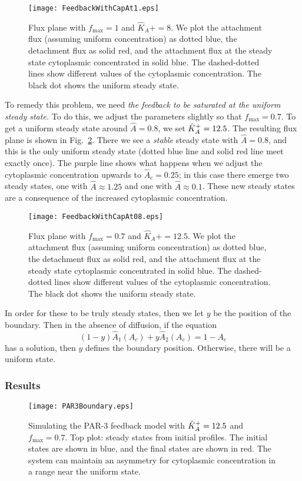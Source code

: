 \documentclass[11pt]{article}
\newcommand{\6}[1]{#1_{\text{6}}}
\newcommand{\3}[1]{#1_{\text{3}}}
\begin{document}
\begin{figure}
\centering
\texttt{[image: FeedbackWithCapAt1.eps]}
\caption{\label{fig:P3FB1}Flux plane with $f_\text{max}=1$ and $\hat K_A+=8$. We plot the attachment flux (assuming uniform concentration) as dotted blue, the detachment flux as solid red, and the attachment flux at the steady state cytoplasmic concentrated in solid blue. The dashed-dotted lines show different values of the cytoplasmic concentration. The black dot shows the uniform steady state.}
\end{figure}

To remedy this problem, we need \emph{the feedback to be saturated at the uniform steady state.} To do this, we adjust the parameters slightly so that $f_\text{max}=0.7$. To get a uniform steady state around $\hat A = 0.8$, we set $\hat{K}^\text{+}_A=12.5$. The resulting flux plane is shown in Fig.\ \ref{fig:P3FB08}. There we see a \emph{stable} steady state with $\hat A = 0.8$, and this is the only uniform steady state (dotted blue line and solid red line meet exactly once). The purple line shows what happens when we adjust the cytoplasmic concentration upwards to $\hat{A}_c=0.25$; in this case there emerge two steady states, one with $\hat{A}\approx 1.25$ and one with $\hat A \approx 0.1$. These new steady states are a consequence of the increased cytoplasmic concentration.

\begin{figure}
\centering
\texttt{[image: FeedbackWithCapAt08.eps]}
\caption{\label{fig:P3FB08}Flux plane with $f_\text{max}=0.7$ and $\hat K_A+=12.5$. We plot the attachment flux (assuming uniform concentration) as dotted blue, the detachment flux as solid red, and the attachment flux at the steady state cytoplasmic concentrated in solid blue. The dashed-dotted lines show different values of the cytoplasmic concentration. The black dot shows the uniform steady state.}
\end{figure}

In order for these to be truly steady states, then we let $y$ be the position of the boundary. Then in the absence of diffusion, if the equation 
\begin{equation}
\label{eq:NoDiffEqn}
(1-y)\hat{A}_1\left(A_c\right)+y \hat{A}_2\left(A_c\right)=1-A_c
\end{equation}
has a solution, then $y$ defines the boundary position. Otherwise, there will be a uniform state.


\subsubsection{Results}
\begin{figure}
\centering
\texttt{[image: PAR3Boundary.eps]}
\caption{\label{fig:P3FBBd}Simulating the PAR-3 feedback model with $\hat{K}^\text{+}_A=12.5$ and $f_\text{max}=0.7$. Top plot: steady states from initial profiles. The initial states are shown in blue, and the final states are shown in red. The system can maintain an asymmetry for cytoplasmic concentration in a range near the uniform state. }
\end{figure}
\end{document}
